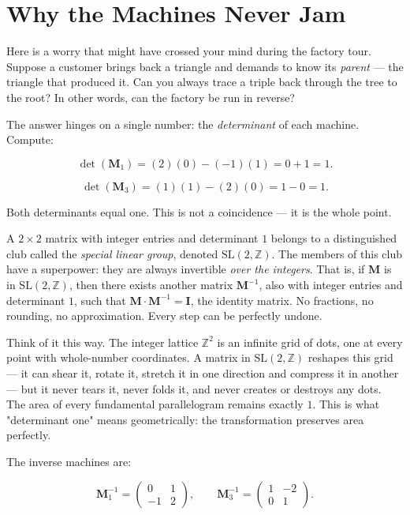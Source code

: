 \documentclass[11pt,openright,twoside]{book}
\theoremstyle{definition}
\begin{document}
\bigskip


\section{Why the Machines Never Jam}

Here is a worry that might have crossed your mind during the factory tour. Suppose a customer brings back a triangle and demands to know its \textit{parent} --- the triangle that produced it. Can you always trace a triple back through the tree to the root? In other words, can the factory be run in reverse?

The answer hinges on a single number: the \textit{determinant} of each machine. Compute:

\[
\det(\mathbf{M}_1) = (2)(0) - (-1)(1) = 0 + 1 = 1.
\]

\[
\det(\mathbf{M}_3) = (1)(1) - (2)(0) = 1 - 0 = 1.
\]

Both determinants equal one. This is not a coincidence --- it is the whole point.

A $2 \times 2$ matrix with integer entries and determinant $1$ belongs to a distinguished club called the \textit{special linear group}, denoted $\mathrm{SL}(2, \mathbb{Z})$. The members of this club have a superpower: they are always invertible \textit{over the integers}. That is, if $\mathbf{M}$ is in $\mathrm{SL}(2, \mathbb{Z})$, then there exists another matrix $\mathbf{M}^{-1}$, also with integer entries and determinant $1$, such that $\mathbf{M} \cdot \mathbf{M}^{-1} = \mathbf{I}$, the identity matrix. No fractions, no rounding, no approximation. Every step can be perfectly undone.

Think of it this way. The integer lattice $\mathbb{Z}^2$ is an infinite grid of dots, one at every point with whole-number coordinates. A matrix in $\mathrm{SL}(2, \mathbb{Z})$ reshapes this grid --- it can shear it, rotate it, stretch it in one direction and compress it in another --- but it never tears it, never folds it, and never creates or destroys any dots. The area of every fundamental parallelogram remains exactly $1$. This is what "determinant one" means geometrically: the transformation preserves area perfectly.

The inverse machines are:

\[
\mathbf{M}_1^{-1} = \begin{pmatrix} 0 & 1 \\ -1 & 2 \end{pmatrix}, \qquad
\mathbf{M}_3^{-1} = \begin{pmatrix} 1 & -2 \\ 0 & 1 \end{pmatrix}.
\]
\end{document}
